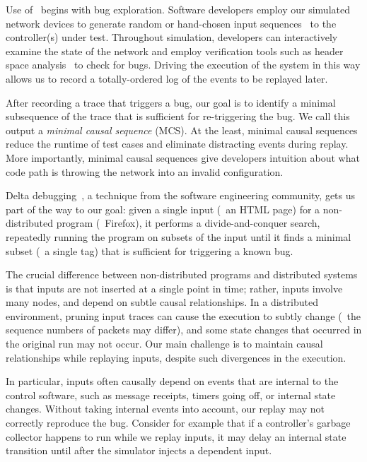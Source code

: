 Use of \simulator~begins with bug exploration.
Software developers employ our simulated network devices to generate
random or hand-chosen input
sequences~\cite{Miller:1990:ESR:96267.96279} to the controller(s) under test. Throughout simulation,
developers can interactively examine the state of the network
and employ verification tools such as header space analysis~\cite{hsa} to check
for bugs. Driving the
execution of the system in this way allows us to record a
totally-ordered log of the events to be replayed later.

After recording a trace that triggers a bug, our goal is to identify a minimal
subsequence of the trace that is sufficient for re-triggering the bug. We
call this output a {\em minimal causal sequence} (MCS).
At the least, minimal causal sequences reduce the runtime of test cases
and eliminate distracting events during replay. More importantly,
minimal causal sequences give developers intuition about what code path is throwing
the network into an invalid configuration.

Delta debugging~\cite{Zeller:1999:YMP:318773.318946}, a technique from the
software engineering community, gets us part of the way
to our goal: given a single input (\eg~an HTML page)
for a non-distributed program (\eg~Firefox), it performs a divide-and-conquer
search, repeatedly running the program on subsets of the input
until it finds a minimal subset (\eg~a single tag) that is sufficient
for triggering a known bug.

The crucial difference between non-distributed programs and distributed
systems is that inputs are not inserted at a single point in time; rather,
inputs involve many nodes, and depend on subtle causal relationships.
In a distributed environment, pruning input traces can cause the execution to
subtly change (\eg~the sequence numbers of packets may differ), and some
state changes that occurred in the original run may not occur. Our main
challenge is to maintain causal relationships while replaying inputs,
despite such divergences in the execution.

In particular, inputs often causally depend on events that are internal to the control software, such as
message receipts, timers going off, or internal state
changes. Without taking internal events into account, our replay may not correctly reproduce the bug.
Consider for example that if a controller's garbage collector happens to run
while we replay inputs, it may delay an internal state transition until
after the simulator injects a dependent input.

